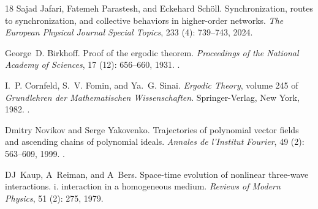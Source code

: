 \documentclass[11pt]{article}
\theoremstyle{thmstyleone}
\theoremstyle{thmstyletwo}
\theoremstyle{thmstylethree}
\begin{document}
\begin{thebibliography}{18}
Sajad Jafari, Fatemeh Parastesh, and Eckehard Sch{\"o}ll.
\newblock Synchronization, routes to synchronization, and collective behaviors in higher-order networks.
\newblock \emph{The European Physical Journal Special Topics}, 233 (4): 739--743, 2024.

George~D. Birkhoff.
\newblock Proof of the ergodic theorem.
\newblock \emph{Proceedings of the National Academy of Sciences}, 17 (12): 656--660, 1931.
\newblock {}.

I.~P. Cornfeld, S.~V. Fomin, and Ya.~G. Sinai.
\newblock \emph{Ergodic Theory}, volume 245 of \emph{Grundlehren der Mathematischen Wissenschaften}.
\newblock Springer-Verlag, New York, 1982.
\newblock {}.

Dmitry Novikov and Serge Yakovenko.
\newblock Trajectories of polynomial vector fields and ascending chains of polynomial ideals.
\newblock \emph{Annales de l'Institut Fourier}, 49 (2): 563--609, 1999.
\newblock {}.

DJ~Kaup, A~Reiman, and A~Bers.
\newblock Space-time evolution of nonlinear three-wave interactions. i. interaction in a homogeneous medium.
\newblock \emph{Reviews of Modern Physics}, 51 (2): 275, 1979.

\end{thebibliography}
\end{document}
